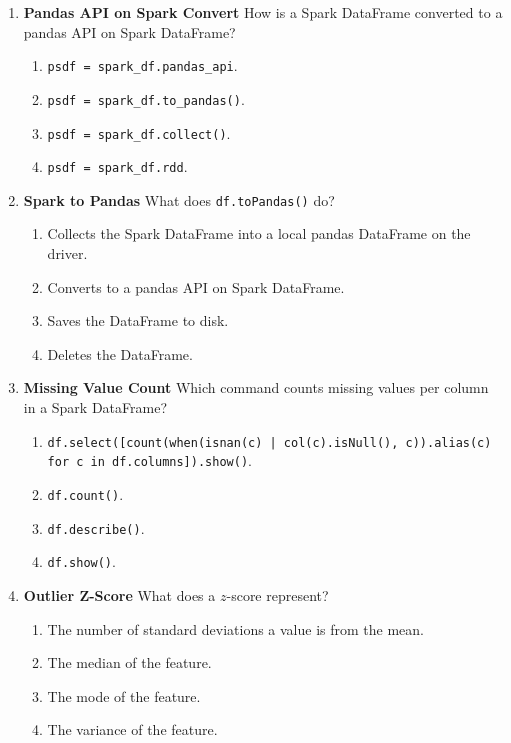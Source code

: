 \documentclass{article}
\begin{document}
\begin{enumerate}[label=\textbf{Q\arabic*.}]
		\item \textbf{Pandas API on Spark Convert}
		How is a Spark DataFrame converted to a pandas API on Spark DataFrame?
		\begin{enumerate}[label=\Alph*.]
			\item \texttt{psdf = spark\_df.pandas\_api}.
			\item \texttt{psdf = spark\_df.to\_pandas()}.
			\item \texttt{psdf = spark\_df.collect()}.
			\item \texttt{psdf = spark\_df.rdd}.
		\end{enumerate}
		
		\item \textbf{Spark to Pandas}
		What does \texttt{df.toPandas()} do?
		\begin{enumerate}[label=\Alph*.]
			\item Collects the Spark DataFrame into a local pandas DataFrame on the driver.
			\item Converts to a pandas API on Spark DataFrame.
			\item Saves the DataFrame to disk.
			\item Deletes the DataFrame.
		\end{enumerate}
		
		\item \textbf{Missing Value Count}
		Which command counts missing values per column in a Spark DataFrame?
		\begin{enumerate}[label=\Alph*.]
			\item \texttt{df.select([count(when(isnan(c) | col(c).isNull(), c)).alias(c) for c in df.columns]).show()}.
			\item \texttt{df.count()}.
			\item \texttt{df.describe()}.
			\item \texttt{df.show()}.
		\end{enumerate}
		
		\item \textbf{Outlier Z-Score}
		What does a $z$-score represent?
		\begin{enumerate}[label=\Alph*.]
			\item The number of standard deviations a value is from the mean.
			\item The median of the feature.
			\item The mode of the feature.
			\item The variance of the feature.
		\end{enumerate}
		

\end{enumerate}
\end{document}
